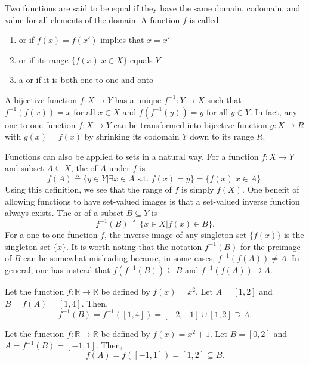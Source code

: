 Two functions are said to be equal if they have the same domain, codomain, and value for all elements of the domain.
A function $f$ is called:
\begin{enumerate}
\item {} or  if $f(x)=f(x')$ implies that $x=x'$
\item {} or  if its range $\{ f(x) | x\in X\}$ equals $Y$
\item a  or  if it is both one-to-one and onto
\end{enumerate}
A bijective function $f: X\rightarrow Y$ has a unique  $f^{-1} : Y\rightarrow X$ such that $f^{-1}(f(x)) = x$ for all $x\in X$ and $f(f^{-1}(y)) = y$ for all $y\in Y$.
In fact, any one-to-one function $f: X\rightarrow Y$ can be transformed into bijective function $g: X \rightarrow R$ with $g(x)=f(x)$ by shrinking its codomain $Y$ down to its range $R$.

Functions can also be applied to sets in a natural way.
For a function $f: X\rightarrow Y$ and subset $A\subseteq X$, the  of $A$ under $f$ is
\[ f(A) \triangleq \{ y\in Y | \exists x\in A \textrm{ s.t. } f(x)=y\} = \{f(x) | x\in A\}. \]
Using this definition, we see that the range of $f$ is simply $f(X)$.
One benefit of allowing functions to have set-valued images is that a set-valued inverse function always exists.
The  or  of a subset $B\subseteq Y$ is
\[ f^{-1}(B) \triangleq \{ x\in X | f(x)\in B\}. \]
For a one-to-one function $f$, the inverse image of any singleton set $\{ f(x) \}$ is the singleton set $\{ x \}$.
It is worth noting that the notation $f^{-1}(B)$ for the preimage of $B$ can be somewhat misleading because, in some cases, $f^{-1}(f(A)) \neq A$.
In general, one has instead that $f(f^{-1}(B)) \subseteq B$ and $f^{-1}(f(A)) \supseteq A$.

\begin{example}
Let the function $f: \mathbb{R} \rightarrow \mathbb{R}$ be defined by $f(x)=x^2$. Let $A=[1,2]$ and $B = f(A) = [1,4]$.  Then,
\[ f^{-1}(B) = f^{-1}([1,4]) = [-2,-1] \cup [1,2] \supseteq A. \]
\end{example}
\begin{example}
Let the function $f: \mathbb{R} \rightarrow \mathbb{R}$ be defined by $f(x)=x^2+1$. Let $B=[0,2]$ and $A = f^{-1}(B) = [-1,1]$.  Then,
\[ f(A) = f([-1,1]) = [1,2] \subseteq B. \]
\end{example}

